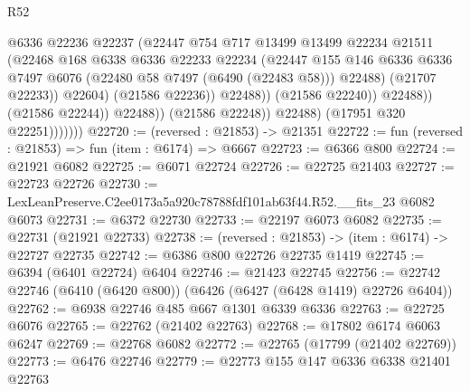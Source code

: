 \begin{lexlean}{R52}
\begin{coremodule}
                                      @6336
                                      @22236
                                      @22237
                                      (@22447
                                        @754
                                        @717
                                        @13499
                                        @13499
                                        @22234
                                        @21511
                                        (@22468
                                          @168
                                          @6338
                                          @6336
                                          @22233
                                          @22234
                                          (@22447
                                            @155
                                            @146
                                            @6336
                                            @6336
                                            @7497
                                            @6076
                                            (@22480 @58 @7497 (@6490 (@22483 @58)))
                                            @22488)
                                          (@21707 @22233))
                                        @22604)
                                      (@21586 @22236))
                                    @22488))
                                (@21586 @22240))
                              @22488))
                          (@21586 @22244))
                        @22488))
                    (@21586 @22248))
                  @22488)
                (@17951 @320 @22251)))))))
@22720 := (reversed : @21853) -> @21351
@22722 := fun (reversed : @21853) => fun (item : @6174) => @6667
@22723 := @6366 @800
@22724 := @21921 @6082
@22725 := @6071 @22724
@22726 := @22725 @21403
@22727 := @22723 @22726
@22730 := LexLeanPreserve.C2ee0173a5a920c78788fdf101ab63f44.R52.__fits_23 @6082 @6073
@22731 := @6372 @22730
@22733 := @22197 @6073 @6082
@22735 := @22731 (@21921 @22733)
@22738 := (reversed : @21853) -> (item : @6174) -> @22727 @22735
@22742 := @6386 @800 @22726 @22735 @1419
@22745 := @6394 (@6401 @22724) @6404
@22746 := @21423 @22745
@22756 := @22742 @22746 (@6410 (@6420 @800)) (@6426 (@6427 (@6428 @1419) @22726 @6404))
@22762 := @6938 @22746 @485 @667 @1301 @6339 @6336
@22763 := @22725 @6076
@22765 := @22762 (@21402 @22763)
@22768 := @17802 @6174 @6063 @6247
@22769 := @22768 @6082
@22772 := @22765 (@17799 (@21402 @22769))
@22773 := @6476 @22746
@22779 := @22773 @155 @147 @6336 @6338 @21401 @22763

\end{coremodule}
\end{lexlean}
